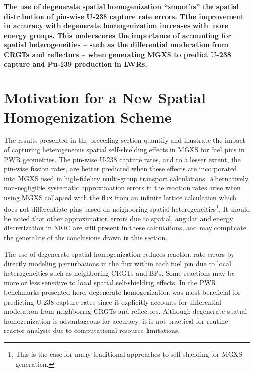 \begin{emphbox}
\textbf{The use of degenerate spatial homogenization ``smooths'' the spatial distribution of pin-wise U-238 capture rate errors. Tthe improvement in accuracy with degenerate homogenization increases with more energy groups. This underscores the importance of accounting for spatial heterogeneities -- such as the differential moderation from \acp{CRGT} and reflectors -- when generating \ac{MGXS} to predict U-238 capture and Pu-239 production in \acp{LWR}.}
\end{emphbox}


\section{Motivation for a New Spatial Homogenization Scheme}
\label{sec:chap8-motivate}

The results presented in the preceding section quantify and illustrate the impact of capturing heterogeneous spatial self-shielding effects in \ac{MGXS} for fuel pins in \ac{PWR} geometries. The pin-wise U-238 capture rates, and to a lesser extent, the pin-wise fission rates, are better predicted when these effects are incorporated into \ac{MGXS} used in high-fidelity multi-group transport calculations. Alternatively, non-negligible systematic approximation errors in the reaction rates arise when using \ac{MGXS} collapsed with the flux from an infinite lattice calculation which does not differentiate pins based on neighboring spatial heterogeneities\footnote{This is the case for many traditional approaches to self-shielding for \ac{MGXS} generation.}. It should be noted that other approximation errors due to spatial, angular and energy discretization in \ac{MOC} are still present in these calculations, and may complicate the generality of the conclusions drawn in this section.

The use of degenerate spatial homogenization reduces reaction rate errors by directly modeling perturbations in the flux within each fuel pin due to local heterogeneities such as neighboring \acp{CRGT} and \acp{BP}. Some reactions may be more or less sensitive to local spatial self-shielding effects. In the \ac{PWR} benchmarks presented here, degenerate homogenization was most beneficial for predicting U-238 capture rates since it explicitly accounts for differential moderation from neighboring \acp{CRGT} and reflectors. Although degenerate spatial homogenization is advantageous for accuracy, it is not practical for routine reactor analysis due to computational resource limitations.

